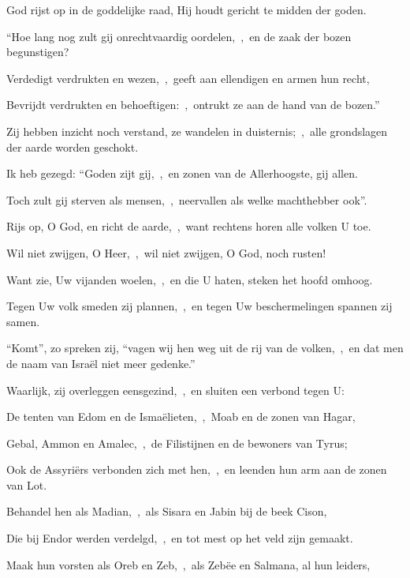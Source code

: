 \documentclass[12pt,twoside,a5paper]{article}
\begin{document}

\begin{halfparskip}
   God rijst op in de goddelijke raad, Hij houdt gericht te midden der goden.


  ``Hoe lang nog zult gij onrechtvaardig oordelen,~\sep\ en de zaak der bozen begunstigen?

  Verdedigt verdrukten en wezen,~\sep\ geeft aan ellendigen en armen hun recht,

  Bevrijdt verdrukten en behoeftigen:~\sep\ ontrukt ze aan de hand van de bozen.''

  Zij hebben inzicht noch verstand, ze wandelen in duisternis;~\sep\ alle grondslagen der aarde worden  geschokt.

  Ik heb gezegd: ``Goden zijt gij,~\sep\ en zonen van de Allerhoogste, gij allen.

  Toch zult gij sterven als mensen,~\sep\ neervallen als welke machthebber ook''.

  Rijs op, O God, en richt de aarde,~\sep\ want rechtens horen alle volken U toe.

   Wil niet zwijgen, O Heer,~\sep\ wil niet zwijgen, O God, noch rusten!

  Want zie, Uw vijanden woelen,~\sep\ en die U haten, steken het hoofd omhoog.

  Tegen Uw volk smeden zij plannen,~\sep\ en tegen Uw beschermelingen spannen zij samen.

  ``Komt'', zo spreken zij, ``vagen wij hen weg uit de rij van de volken,~\sep\ en dat men de naam van Israël niet meer gedenke.''

  Waarlijk, zij overleggen eensgezind,~\sep\ en sluiten een verbond tegen U:

  De tenten van Edom en de Ismaëlieten,~\sep\ Moab en de zonen van Hagar,

  Gebal, Ammon en Amalec,~\sep\ de Filistijnen en de bewoners van Tyrus;

  Ook de Assyriërs verbonden zich met hen,~\sep\ en leenden hun arm aan de zonen van Lot.

  Behandel hen als Madian,~\sep\ als Sisara en Jabin bij de beek Cison,

  Die bij Endor werden verdelgd,~\sep\ en tot mest op het veld zijn gemaakt.

  Maak hun vorsten als Oreb en Zeb,~\sep\ als Zebëe en Salmana, al hun leiders,


\end{halfparskip}
\end{document}
